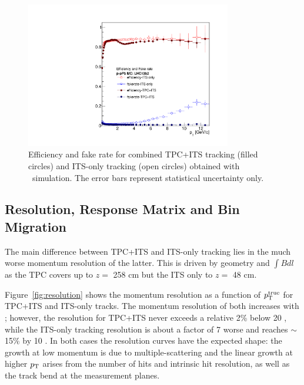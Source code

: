 \begin{figure}[h]
\center
\includegraphics[width=0.8\textwidth]{Data_Analysis/Tracking/HybridAndITS_Eff_fakerate_pPb_lowpt.pdf}
\caption{Efficiency and fake rate for combined TPC+ITS tracking (filled circles) and ITS-only tracking (open circles) obtained with \pPb~simulation. The error bars represent statistical uncertainty only.}
\label{fig:tpcEff}
\end{figure}

\FloatBarrier

\subsection{Resolution, Response Matrix and Bin Migration}
The main difference between TPC+ITS and ITS-only tracking lies in the much worse momentum resolution of the latter. This is driven by geometry 
and $\int Bdl$ as the TPC covers up to {$z=$ 258 cm} but the ITS only to {$z=$ 48 cm}. 

Figure~\ref{fig:resolution} shows the momentum resolution as a function of $p_{\mathrm{T}}^{\mathrm{true}}$ for 
TPC+ITS and ITS-only tracks. The momentum resolution of both increases with \pt; however, the resolution for TPC+ITS never exceeds a relative 2\% below 20 \GeVc, while the ITS-only tracking resolution is about a factor of 7 worse and reaches $\sim$15\% by 10 \GeVc. In both cases the resolution curves have the expected shape: the growth at low momentum is due to multiple-scattering and the linear growth at higher $p_{\mathrm{T}}$ arises from the number of hits and intrinsic hit resolution, as well as the track bend at the measurement planes. 

